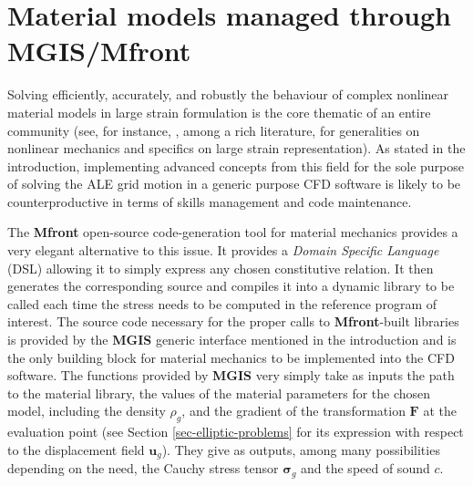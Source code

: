 \section{Material models managed through MGIS/Mfront}
\label{sec-Mfront}
Solving efficiently, accurately, and robustly the behaviour of complex nonlinear material models in large strain formulation is the core thematic of an entire community (see, for instance, \cite{doghri_mechanics_2000, yavari_spatial_2006,blume_compatibility_1989}, among a rich literature, for generalities on nonlinear mechanics and specifics on large strain representation). As stated in the introduction, implementing advanced concepts from this field for the sole purpose of solving the ALE grid motion in a generic purpose CFD software is likely to be counterproductive in terms of skills management and code maintenance.

The \textbf{Mfront} open-source code-generation tool for material mechanics provides a very elegant alternative to this issue. It provides a \textit{Domain Specific Language} (DSL) allowing it to simply express any chosen constitutive relation. It then generates the corresponding source and compiles it into a dynamic library to be called each time the stress needs to be computed in the reference program of interest. The source code necessary for the proper calls to \textbf{Mfront}-built libraries is provided by the \textbf{MGIS} generic interface mentioned in the introduction and is the only building block for material mechanics to be implemented into the CFD software. The functions provided by \textbf{MGIS} very simply take as inputs the path to the material library, the values of the material parameters for the chosen model, including the density $\rho_g$, and the gradient of the transformation $\mathbf{F}$ at the evaluation point (see Section \ref{sec-elliptic-problems} for its expression with respect to the displacement field $\mathbf{u}_g$). They give as outputs, among many possibilities depending on the need, the Cauchy stress tensor $\boldsymbol{\sigma}_g$ and the speed of sound $c$.

